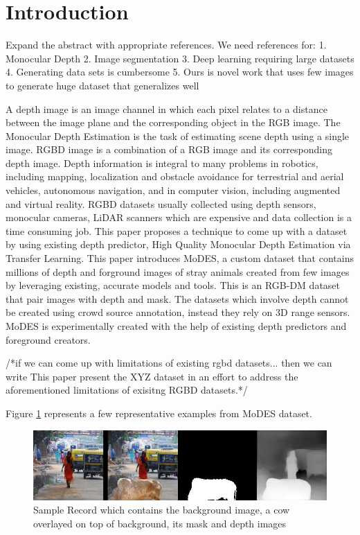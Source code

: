 \documentclass{article}
\begin{document}
 

\section{Introduction}
Expand the abstract with appropriate references. We need references for:
1. Monocular Depth
2. Image segmentation
3. Deep learning requiring large datasets
4. Generating data sets is cumbersome
5. Ours is novel work that uses few images to generate huge dataset that generalizes well


A depth image is an image channel in which each pixel relates to a distance between the image plane and the corresponding object in the RGB image. 
The Monocular Depth Estimation is the task of estimating scene depth using a single image\cite{abuolaim2020defocus}. 
RGBD image is a combination of a RGB image and its corresponding depth image\cite{zhang2018deep}.
 Depth information is integral to many problems in
robotics, including mapping, localization and obstacle avoidance for terrestrial and aerial vehicles, autonomous navigation, and in computer vision,
 including augmented and virtual reality\cite{marchand2015pose}. RGBD datasets usually collected using depth sensors, monocular cameras, 
 LiDAR scanners which are expensive and data collection is a time consuming job. This paper proposes a technique to come up with a dataset 
 by using existing depth predictor, High Quality Monocular Depth Estimation via Transfer Learning. This paper introduces MoDES, 
 a custom dataset that contains millions of depth and forground images of stray animals created from few images by leveraging existing, 
 accurate models and tools. This is an RGB-DM dataset that pair images with depth and mask. The datasets which involve depth cannot be 
 created using crowd source annotation, instead they rely on 3D range sensors. MoDES is experimentally created with the help of existing 
 depth predictors and foreground creators.

/*if we can come up with limitations of existing rgbd datasets... then we can write This paper present the XYZ dataset 
in an effort to address the aforementioned limitations of exisitng RGBD datasets.*/

Figure \ref{fig:sampledatarecord} represents a few representative examples from MoDES dataset.

\begin{figure}[h!]
\centering
  \includegraphics[width=1\textwidth]{samplerecord.png}
  \caption{Sample Record which contains the background image, a cow overlayed on top of background, its mask and depth images}
  \label{fig:sampledatarecord}
\end{figure}
\end{document}
